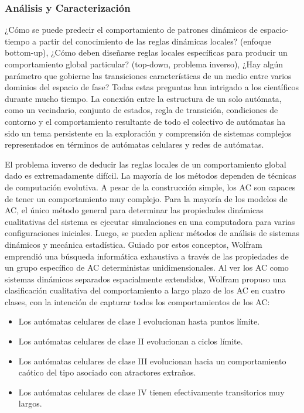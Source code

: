 \subsubsection{Análisis y Caracterización}

¿Cómo se puede predecir el comportamiento de patrones dinámicos de espacio-tiempo   a partir del conocimiento de las reglas  dinámicas locales? (enfoque bottom-up), ¿Cómo deben diseñarse reglas  locales específicas para producir un comportamiento global particular? (top-down, problema inverso), ¿Hay algún parámetro que gobierne las transiciones características de un medio entre varios dominios del espacio de fase? Todas estas preguntas han intrigado a los científicos durante mucho tiempo. La conexión entre la estructura de un solo autómata, como un vecindario, conjunto de estados, regla de transición, condiciones de contorno y el comportamiento resultante de todo el colectivo de autómatas ha sido un tema persistente en la exploración y comprensión de sistemas complejos representados en términos de autómatas celulares y redes de autómatas.

El problema inverso de deducir las reglas locales de un comportamiento global dado es extremadamente difícil.  La mayoría de los métodos dependen de técnicas de computación evolutiva.  A pesar de la construcción simple, los AC son capaces de tener un comportamiento muy complejo. Para la mayoría de los modelos de AC, el único método general para determinar las propiedades dinámicas cualitativas del sistema es ejecutar simulaciones en una computadora para varias configuraciones iniciales. Luego, se pueden aplicar métodos de análisis de sistemas dinámicos y mecánica estadística. Guiado por estos conceptos, Wolfram  emprendió una búsqueda informática exhaustiva a través de las propiedades de un grupo específico de AC deterministas unidimensionales. Al ver los AC como sistemas dinámicos separados espacialmente extendidos, Wolfram propuso una clasificación cualitativa del comportamiento a largo plazo de los AC en cuatro clases, con la intención de capturar todos los comportamientos de los AC:

\begin{itemize}
	\item Los autómatas celulares de clase I evolucionan hasta puntos límite.
	\item Los autómatas celulares de clase II evolucionan a ciclos límite.
	\item Los autómatas celulares de clase III evolucionan hacia un comportamiento caótico del tipo asociado con atractores extraños.
	\item Los autómatas celulares de clase IV tienen efectivamente transitorios muy largos.
\end{itemize}


